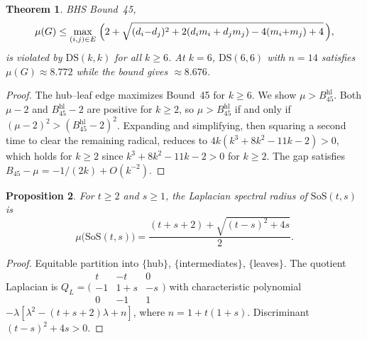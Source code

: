 \documentclass[preprint,12pt]{elsarticle}
\newtheorem{theorem}{Theorem}[section]
\newtheorem{proposition}[theorem]{Proposition}
\theoremstyle{definition}
\theoremstyle{remark}
\newcommand{\SoS}{\mathrm{SoS}}       %
\newcommand{\DS}{\mathrm{DS}}          %
\newcommand{\Lspec}{\mu}               %
\begin{document}

\begin{theorem}\label{thm:bound45}
  BHS Bound~45,
  \begin{equation}\label{eq:bound45}
    \Lspec(G) \leq \max_{(i,j) \in E}\; \Bigl(2 + \sqrt{(d_i{-}d_j)^2 + 2(d_i m_i + d_j m_j)
      - 4(m_i{+}m_j) + 4}\,\Bigr),
  \end{equation}
  is violated by $\DS(k,k)$ for all $k \geq 6$.
  At $k = 6$, $\DS(6,6)$ with $n = 14$ satisfies
  $\Lspec(G) \approx 8.772$ while the bound gives $\approx 8.676$.
\end{theorem}

\begin{proof}
  The hub--leaf edge maximizes Bound~45 for $k \geq 6$. We show
  $\Lspec > B_{45}^{\mathrm{hl}}$. Both $\Lspec - 2$ and
  $B_{45}^{\mathrm{hl}} - 2$ are positive for $k \geq 2$, so
  $\Lspec > B_{45}^{\mathrm{hl}}$ if and only if
  $(\Lspec - 2)^2 > (B_{45}^{\mathrm{hl}} - 2)^2$.
  Expanding and simplifying, then squaring a second time to
  clear the remaining radical, reduces to
  $4k(k^3 + 8k^2 - 11k - 2) > 0$, which holds for $k \geq 2$ since
  $k^3 + 8k^2 - 11k - 2 > 0$ for $k \geq 2$.
  The gap satisfies $B_{45} - \Lspec = -1/(2k) + O(k^{-2})$.
\end{proof}



\begin{proposition}\label{prop:mu-sos}
  For $t \geq 2$ and $s \geq 1$, the Laplacian spectral radius of
  $\SoS(t, s)$ is
  \begin{equation}\label{eq:mu-sos}
    \Lspec\bigl(\SoS(t, s)\bigr)
    = \frac{(t + s + 2) + \sqrt{(t - s)^2 + 4s}}{2}.
  \end{equation}
\end{proposition}

\begin{proof}
  Equitable partition into $\{$hub$\}$, $\{$intermediates$\}$,
  $\{$leaves$\}$. The quotient Laplacian is
  $Q_L = \bigl(\begin{smallmatrix} t & -t & 0 \\ -1 & 1{+}s & -s \\ 0 & -1 & 1 \end{smallmatrix}\bigr)$
  with characteristic polynomial
  $-\lambda[\lambda^2 - (t+s+2)\lambda + n]$, where $n = 1 + t(1+s)$.
  Discriminant $(t-s)^2 + 4s > 0$.
\end{proof}
\end{document}
